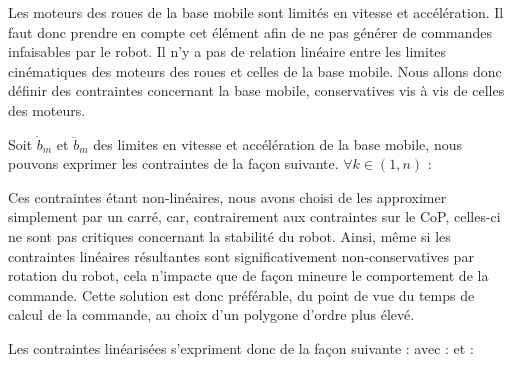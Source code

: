 				
				\label{section.ctr_base_3_roues}
				
				Les moteurs des roues de la base mobile sont limités en vitesse et accélération. Il faut donc prendre en compte cet élément afin de ne pas générer de commandes infaisables par le robot.
				Il n'y a pas de relation linéaire entre les limites cinématiques des moteurs des roues et celles de la base mobile.
				Nous allons donc définir des contraintes concernant la base mobile, conservatives vis à vis de celles des moteurs.
				
				Soit $\dot{b}_{m}$ et $\ddot{b}_{m}$ des limites en vitesse et accélération de la base mobile, nous pouvons exprimer les contraintes de la façon suivante.  
				$\forall k \in (1, n)$ :
				
				Ces contraintes étant non-linéaires, nous avons choisi de les approximer simplement par un carré, car, contrairement aux contraintes sur le CoP, celles-ci ne sont pas critiques concernant la stabilité du robot.
				Ainsi, même si les contraintes linéaires résultantes sont significativement non-conservatives par rotation du robot, cela n'impacte que de façon mineure le comportement de la commande.
				Cette solution est donc préférable, du point de vue du temps de calcul de la commande, au choix d'un polygone d'ordre plus élevé.
				
				
				Les contraintes linéarisées s'expriment donc de la façon suivante :
					avec :
					et :
	
